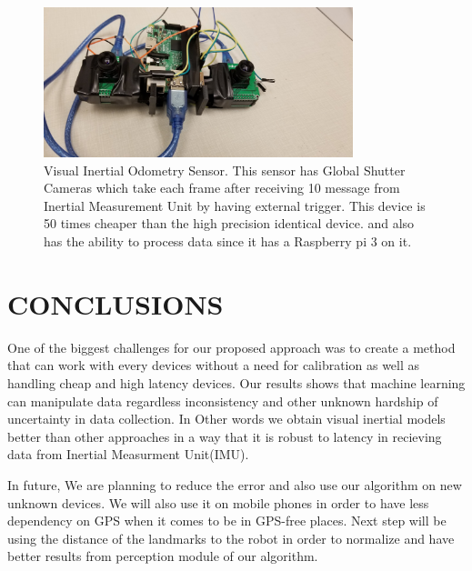 \documentclass[a4paper,twoside]{article}
\begin{document}
\begin{figure}

  \includegraphics[width=90mm]{vio_sensor.jpg}
  \caption{Visual Inertial Odometry Sensor. This sensor has Global Shutter Cameras which take each frame after receiving 10 message from Inertial Measurement Unit by having external trigger. This device is 50 times cheaper than the high precision identical device. and also has the ability to process data since it has a Raspberry pi 3 on it. }
  \label{fig:vio}
\end{figure}


\section{CONCLUSIONS}

One of the biggest challenges for our proposed approach was to create a method that can work with every devices without  a need  for calibration as well as handling cheap and high latency devices. Our results shows that machine learning can manipulate data regardless inconsistency and other unknown  hardship of uncertainty in data collection. In Other words we obtain visual inertial models better than other approaches in a way that it is robust to latency in recieving data from Inertial Measurment Unit(IMU).

In future, We are planning to reduce the error and also use our algorithm on new unknown devices. We will also use it on mobile phones in order to have less dependency on GPS when it comes to be in GPS-free places.
Next step will be using the distance of the landmarks to the robot in order to normalize and have better results from perception module of our algorithm.
\addtolength{\textheight}{-12cm} 


{\small
}
\end{document}
